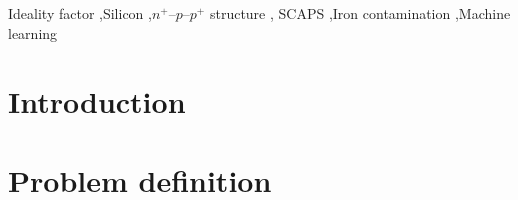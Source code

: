 \documentclass[a4paper,fleqn]{cas-dc}
\begin{document}
\begin{keywords}
Ideality factor \sep Silicon \sep $n^+$--$p$--$p^+$ structure \sep
SCAPS \sep Iron contamination \sep Machine learning
\end{keywords}

\maketitle

\section{Introduction}\label{Int}




\cite{NFL}


\section{Problem definition}\label{MM}
\end{document}
